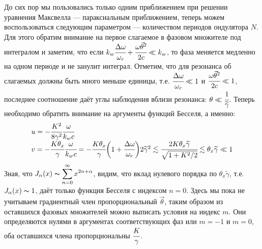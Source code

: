 До сих пор мы пользовались только одним приближением при решении уравнения Максвелла --- параксиальным приближением, теперь можем воспользоваться следующим параметром --- количеством периодов ондулятора $N$. Для этого обратим внимание на первое слагаемое в фазовом множителе под интегралом и заметим, что если $k_w \cfrac{\Delta\omega}{\omega_r} + 
\cfrac{\omega\vec{\theta}^2}{2c} \ll k_w$, то фаза меняется медленно на одном периоде и не занулит интеграл. Отметим, что для резонанса об слагаемых должны быть много меньше единицы, т.е. $\cfrac{\Delta\omega}{\omega_r} \ll 1$ и $\cfrac{\omega\vec{\theta}^2}{2c} \ll 1$, последнее соотношение даёт углы наблюдения вблизи резонанса: $\theta \ll \cfrac{1}{\widetilde{\gamma}}$. Теперь необходимо обратить внимание на аргументы функций Бесселя, а именно: 
\begin{equation}
	\begin{array}{lcl}
		u = -\cfrac{K^2}{8\gamma^2}\cfrac{\omega}{k_w c}\\
		v = -\cfrac{K{\theta_x}}{\gamma}\cfrac{\omega}{k_w c} = - \cfrac{K{\theta_x}}{\gamma}
		\bigg(1 + \cfrac{\Delta\omega}{\omega_r}\bigg)2\widetilde{\gamma}^2 \lesssim
		\cfrac{2K{\theta_x}\widetilde{\gamma}}{\sqrt{1 + K^2/2}} \lesssim \theta_x\widetilde{\gamma} \ll 1
	\end{array}	
\end{equation}
Зная, что $J_\alpha(x) \thicksim \displaystyle\sum\limits_{n =0}^{\infty} x^{2n + \alpha} $, видим, что вклад нулевого порядка по $\theta_x\widetilde{\gamma}$, т.е. $J_\alpha(x) \thicksim 1$, даёт только функция Бесселя с индексом $n = 0$. Здесь мы пока не учитываем градиентный член пропорциональный $\vec{\theta}$, таким образом из оставшихся фазовых множителей можно выписать условия на индекс $m$. Они определяются нулями в аргументах соответствующих фаз или $m = -1$ и $m = 0$, оба оставшихся члена пропорциональны $\cfrac{K}{\gamma}$. 

